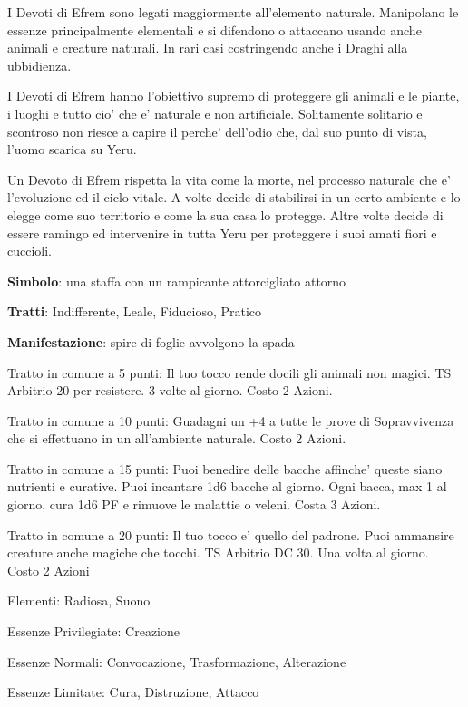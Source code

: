 \documentclass[a4paper,11pt,twoside,openany]{book}
\begin{document}
{		I Devoti di Efrem sono legati maggiormente all'elemento naturale. Manipolano le essenze principalmente elementali e si difendono o attaccano usando anche animali e creature naturali. In rari casi costringendo anche i Draghi alla ubbidienza.
		
		I Devoti di Efrem hanno l'obiettivo supremo di proteggere gli animali e le piante, i luoghi e tutto cio' che e' naturale e non artificiale. Solitamente solitario e scontroso non riesce a capire il perche' dell'odio che, dal suo punto di vista, l'uomo scarica su Yeru.
		
		Un Devoto di Efrem rispetta la vita come la morte, nel processo naturale che e' l'evoluzione ed il ciclo vitale. A volte decide di stabilirsi in un certo ambiente e lo elegge come suo territorio e come la sua casa lo protegge. Altre volte decide di essere ramingo ed intervenire in tutta Yeru per proteggere i suoi amati fiori e cuccioli.
		
		\textbf{Simbolo}: una staffa con un rampicante attorcigliato attorno
		
		\textbf{Tratti}: Indifferente, Leale, Fiducioso, Pratico
		
		\textbf{Manifestazione}: spire di foglie avvolgono la spada
		
		\bigskip
		
		Tratto in comune a 5 punti: Il tuo tocco rende docili gli animali non magici. TS Arbitrio 20 per resistere. 3 volte al giorno. Costo 2 Azioni.
		
		Tratto in comune a 10 punti: Guadagni un +4 a tutte le prove di Sopravvivenza che si effettuano in un all'ambiente naturale. Costo 2 Azioni.
		
		Tratto in comune a 15 punti: Puoi benedire delle bacche affinche' queste siano nutrienti e curative. Puoi incantare 1d6 bacche al giorno. Ogni bacca, max 1 al giorno, cura 1d6 PF e rimuove le malattie o veleni. Costa 3 Azioni.
		
		Tratto in comune a 20 punti: Il tuo tocco e' quello del padrone. Puoi ammansire creature anche magiche che tocchi. TS Arbitrio DC 30. Una volta al giorno. Costo 2 Azioni
		
		\bigskip
		
		Elementi: Radiosa, Suono
		
		\bigskip
		
		Essenze Privilegiate: Creazione
		
		Essenze Normali: Convocazione, Trasformazione, Alterazione
		
		Essenze Limitate: Cura, Distruzione, Attacco
		
}
\end{document}
